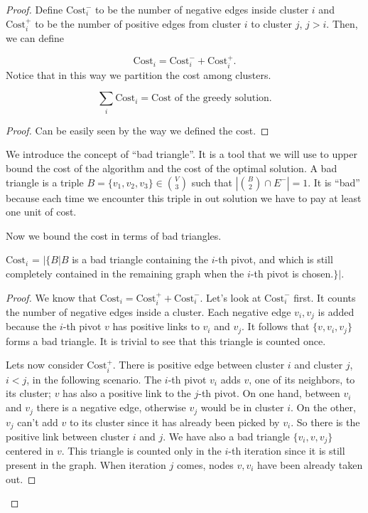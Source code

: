 \begin{proof}
	Define $\text{Cost}_i^-$ to be the number of negative edges inside cluster $i$ and $\text{Cost}_i^+$ to be the number of positive edges from cluster $i$ to cluster $j$, $j >  i$. Then, we can define
	
	\begin{equation}
	\text{Cost}_i = \text{Cost}_i^- + \text{Cost}_i^+.
	\end{equation}
Notice that in this way we partition the cost among clusters.
	\begin{lem}
		\begin{equation}
		\sum_i \text{Cost}_i = \text{Cost of the greedy solution.}
		\end{equation}
	\end{lem}
	\begin{proof}
		Can be easily seen by the way we defined the cost.
	\end{proof}
	We introduce the concept of ``bad triangle''. It is a tool that we will use to upper bound the cost of the algorithm and the cost of the optimal solution. A bad triangle is a triple $B = \{v_1, v_2, v_3\} \in \binom{V}{3}$ such that $|\binom{B}{2} \cap E^-| = 1$. It is ``bad'' because each time we encounter this triple in out solution we have to pay at least one unit of cost.
	
	Now we bound the cost in terms of bad triangles.
	
	\begin{lem}
		\begin{center}
			$\text{Cost}_i$ = $|\{B | B $ is a bad triangle containing the $i$-th pivot, and which is still completely contained in the remaining graph when the $i$-th pivot is chosen.$\}|$. 
		\end{center}
	\end{lem}
	\begin{proof}
		We know that $\text{Cost}_i = \text{Cost}_i^+ + \text{Cost}_i^-$. Let's look at $\text{Cost}^-_i$ first. It counts the number of negative edges inside a cluster. Each negative edge ${v_i, v_j}$ is added because the $i$-th pivot $v$ has positive links to $v_i$ and $v_j$. It follows that $\{v, v_i, v_j\}$ forms a bad triangle. It is trivial to see that this triangle is counted once.
		
		Lets now consider $\text{Cost}_i^+$. There is positive edge between cluster $i$ and cluster $j$, $i < j$, in the following scenario. The $i$-th pivot $v_i$ adds $v$, one of its neighbors, to its cluster; $v$ has also a positive link to the $j$-th pivot. On one hand, between $v_i$ and $v_j$ there is a negative edge, otherwise $v_j$ would be in cluster $i$. On the other, $v_j$ can't add $v$ to its cluster since it has already been picked by $v_i$. So there is the positive link between cluster $i$ and $j$. We have also a bad triangle $\{v_i, v, v_j\}$ centered in $v$. This triangle is counted only in the $i$-th iteration since it is still present in the graph. When iteration $j$ comes, nodes $v, v_i$ have been already taken out. 
		

\end{proof}
\end{proof}
